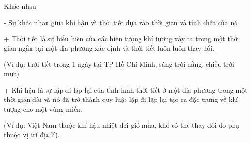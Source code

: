 \begin{enumerate}[label=\bfseries Câu \arabic*:]
{		Khác nhau
		
		- Sự khác nhau giữa khí hậu và thời tiết dựa vào thời gian và tính chất của nó
		
		+ Thời tiết là sự biểu hiện của các hiện tượng khí tượng xảy ra trong một thời gian ngắn tại một địa phương xác định và thời tiết luôn luôn thay đổi.
		
		(Ví dụ:  thời tiết trong 1 ngày tại TP Hồ Chí Minh, sáng trời nắng, chiều trời mưa)
		
		+ Khí hậu là sự lặp đi lặp lại của tình hình thời tiết ở một địa phương trong một thời gian dài và nó đã trở thành quy luật lặp đi lặp lại tạo ra đặc trưng về khí tượng cho một vùng miền.
		
		(Ví dụ: Việt Nam thuộc khí hậu nhiệt đới gió mùa, khó có thể thay đổi do phụ thuộc vị trí địa lí).
		
	}
	
\end{enumerate}